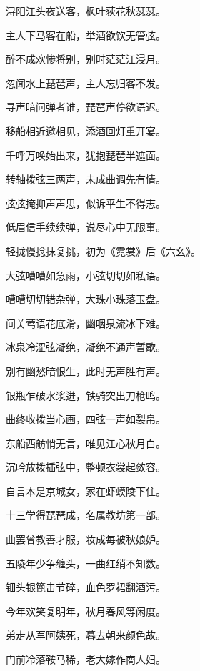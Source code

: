 \documentclass[12pt,UTF-8,openany,fontset=none]{ctexbook}
\begin{document}
    \vspace{12pt}

\begin{center}
    \begin{Large}

        浔阳江头夜送客，枫叶荻花秋瑟瑟。

        主人下马客在船，举酒欲饮无管弦。

        醉不成欢惨将别，别时茫茫江浸月。

        忽闻水上琵琶声，主人忘归客不发。

        寻声暗问弹者谁，琵琶声停欲语迟。

        移船相近邀相见，添酒回灯重开宴。

        千呼万唤始出来，犹抱琵琶半遮面。

        转轴拨弦三两声，未成曲调先有情。

        弦弦掩抑声声思，似诉平生不得志。

        低眉信手续续弹，说尽心中无限事。

       \hspace{58pt} 轻拢慢捻抹复挑，初为《霓裳》后《六幺》。

        大弦嘈嘈如急雨，小弦切切如私语。

        嘈嘈切切错杂弹，大珠小珠落玉盘。

        间关莺语花底滑，幽咽泉流冰下难。

        冰泉冷涩弦凝绝，凝绝不通声暂歇。

        别有幽愁暗恨生，此时无声胜有声。

        银瓶乍破水浆迸，铁骑突出刀枪鸣。

        曲终收拨当心画，四弦一声如裂帛。

        东船西舫悄无言，唯见江心秋月白。

        沉吟放拨插弦中，整顿衣裳起敛容。

        自言本是京城女，家在虾蟆陵下住。

        十三学得琵琶成，名属教坊第一部。

        曲罢曾教善才服，妆成每被秋娘妒。

        五陵年少争缠头，一曲红绡不知数。

        钿头银篦击节碎，血色罗裙翻酒污。

        今年欢笑复明年，秋月春风等闲度。

        弟走从军阿姨死，暮去朝来颜色故。

        门前冷落鞍马稀，老大嫁作商人妇。


\end{Large}
\end{center}
\end{document}
